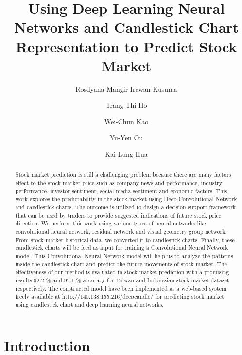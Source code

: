 \documentclass[10pt,twocolumn]{article}
\begin{document}
\title{Using Deep Learning Neural Networks and Candlestick Chart Representation to Predict Stock Market}



\author[1]{Rosdyana Mangir Irawan Kusuma}
\author[2]{Trang-Thi Ho}
\author[3]{Wei-Chun Kao}
\author[1]{Yu-Yen Ou}
\author[2]{Kai-Lung Hua}
\renewcommand\Authands{ and }

\maketitle

\thispagestyle{empty}

\begin{abstract}
Stock market prediction is still a challenging problem because there are many factors effect to the stock market price such as company news and performance, industry performance, investor sentiment, social media sentiment and economic factors. This work explores the predictability in the stock market using Deep Convolutional Network and candlestick charts. The outcome is utilized to design a decision support framework that can be used by traders to provide suggested indications of future stock price direction. We perform this work using various types of neural networks like convolutional neural network, residual network and visual geometry group network. From stock market historical data, we converted it to candlestick charts. Finally, these candlestick charts will be feed as input for training a Convolutional Neural Network model. This Convolutional Neural Network model will help us to analyze the patterns inside the candlestick chart and predict the future movements of stock market. The effectiveness of our method is evaluated in stock market prediction with a promising results 92.2 \% and 92.1 \% accuracy for Taiwan and Indonesian stock market dataset respectively. The constructed model have been implemented as a web-based system freely available at \url{http://140.138.155.216/deepcandle/} for predicting stock market using candlestick chart and deep learning neural networks.
\end{abstract}


\section{Introduction}
\end{document}
